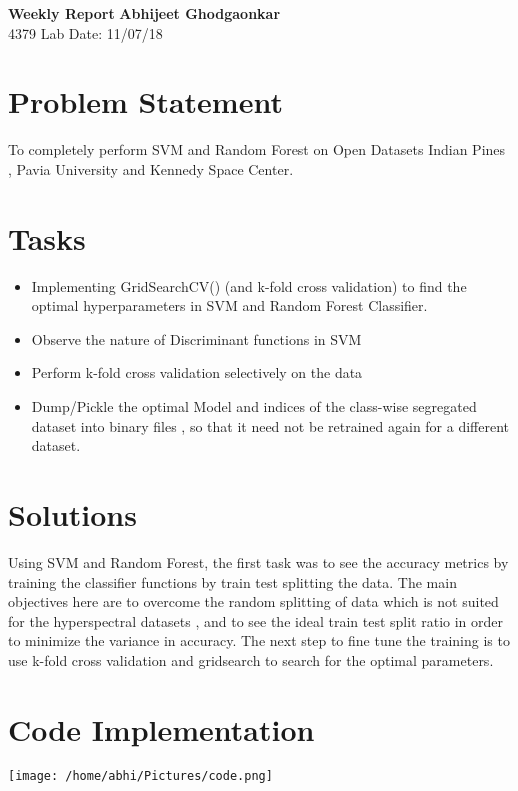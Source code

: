 \documentclass[a4paper, 11pt]{article}
\begin{document}
\noindent
\large\textbf{Weekly Report} \hfill \textbf{Abhijeet Ghodgaonkar} \\
\normalsize 4379 Lab \hfill 
 \hfill Date: 11/07/18 \\


\section{Problem Statement}
To completely perform SVM and Random Forest on Open Datasets Indian Pines , Pavia University and Kennedy Space Center.

\section{Tasks}
\begin{itemize}

\item Implementing GridSearchCV() (and k-fold cross validation) to find the optimal hyperparameters in SVM and Random Forest Classifier.
\item Observe the nature of Discriminant functions in SVM
\item Perform k-fold cross validation selectively on the data
\item Dump/Pickle the optimal Model and indices of the class-wise segregated dataset into binary files , so that it need not be retrained again for a different dataset.

\end{itemize}

\section{Solutions}
Using SVM and Random Forest, the first task was to see the accuracy metrics by training the classifier functions by train test splitting the data. 
\newline
The main objectives here are to overcome the random splitting of data which is not suited for the hyperspectral datasets , and to see the ideal train test split ratio in order to minimize the variance in accuracy.
\newline
The next step to fine tune the training is to use k-fold cross validation and gridsearch to search for the optimal parameters.




\section{Code Implementation}
\texttt{[image: /home/abhi/Pictures/code.png]}
\end{document}
